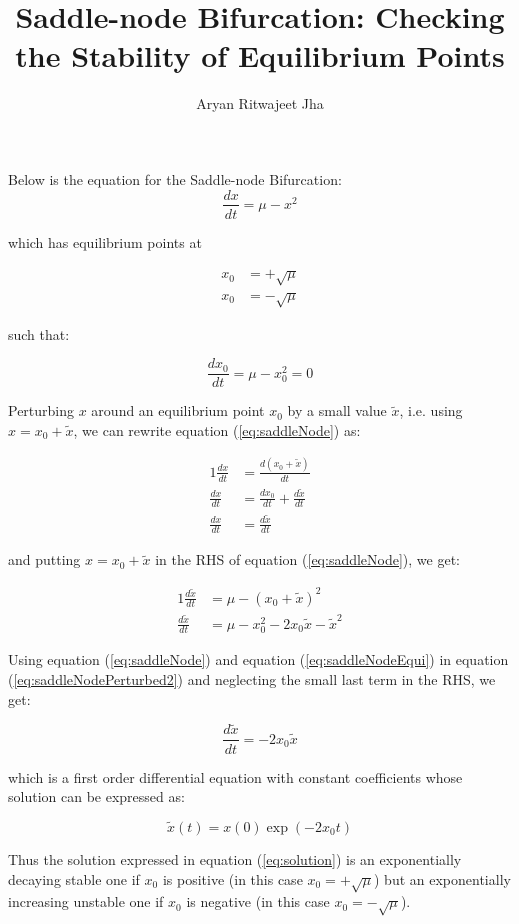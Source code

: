 \documentclass{article}
\begin{document}
	\title{Saddle-node Bifurcation: Checking the Stability of Equilibrium Points}
	\author{Aryan Ritwajeet Jha}
	\maketitle
	
Below is the equation for the Saddle-node Bifurcation: 
	\begin{equation}
		\label{eq:saddleNode}
		\frac{dx}{dt} = \mu - x^2
	\end{equation}
	
which has equilibrium points at
	
	\begin{align*}
		x_0 &= +\sqrt\mu \\
		x_0 &= -\sqrt\mu
	\end{align*} 

such that:
	
	\begin{equation}
		\label{eq:saddleNodeEqui}
		\frac{dx_0}{dt} = \mu - x_0^2 = 0 
	\end{equation}
	
	
Perturbing $x$ around an equilibrium point $x_0$ by a small value $\tilde x$, i.e. using $x = x_0 + \tilde x$, we can rewrite equation (\ref{eq:saddleNode}) as:
	
	\begin{alignat}{1}
		\label{eq:saddleNodePerturbed}
		\frac{dx}{dt} &= \frac{d(x_0 + \tilde x)}{dt} \nonumber \\
		\frac{dx}{dt} &= \frac{dx_0}{dt} + \frac{d \tilde x}{dt} \\
		\frac{dx}{dt} &= \frac{d \tilde x}{dt} \nonumber
	\end{alignat}

and putting $x = x_0 + \tilde x$ in the RHS of equation (\ref{eq:saddleNode}), we get:
	
	\begin{alignat}{1}
		\label{eq:saddleNodePerturbed2}
		\frac{d\tilde x}{dt} &= \mu - (x_0+\tilde x)^2 \nonumber \\
		\frac{d\tilde x}{dt} &= \mu - x_0^2 -2x_0\tilde x - \tilde x^2
	\end{alignat}
	
Using equation (\ref{eq:saddleNode}) and equation (\ref{eq:saddleNodeEqui}) in equation (\ref{eq:saddleNodePerturbed2}) and neglecting the small last term in the RHS, we get:
	
	\begin{equation}
		\frac{d\tilde x}{dt} = -2x_0\tilde x
	\end{equation}

which is a first order differential equation with constant coefficients whose solution can be expressed as:

	\begin{equation}
		\label{eq:solution}
		\tilde{x}(t) = x(0)\exp{(-2x_0t)} 
	\end{equation}

Thus the solution expressed in equation (\ref{eq:solution}) is an exponentially decaying stable one if $x_0$ is positive (in this case $x_0 = +\sqrt{\mu}$) but an exponentially increasing unstable one if $x_0$ is negative (in this case $x_0 = -\sqrt{\mu}$).
\end{document}
